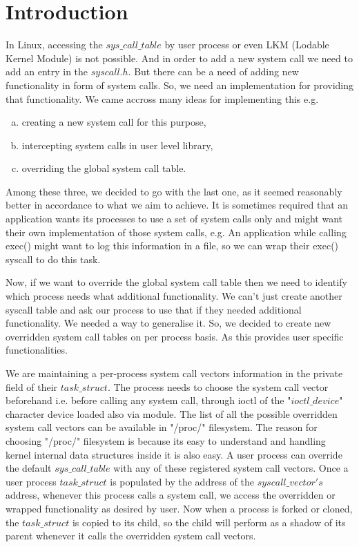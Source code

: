 \documentclass[11pt]{article}
\begin{document}
\section{Introduction}


In Linux, accessing the $sys\_call\_table$ by user process or even
LKM (Lodable Kernel Module) is not possible. And in order to add a new system call we need to add an entry
in the $syscall.h$.  But there can be a need of adding new functionality in form of system calls. So,
we need an implementation for providing that functionality. We came accross many ideas for implementing
this e.g. 
\begin{enumerate}[(a)]
\item
creating a new system call for this purpose, 
\item
intercepting system calls in user level library, 
\item
overriding the global system call table. 
\end{enumerate}
Among these three, we decided to go with the last one, as it
seemed reasonably better in accordance to what we aim to achieve. It is sometimes required that an application wants its processes to use a set of system calls only and might want their own implementation of those system calls, e.g. An application while calling 
exec() might want to log this information in a file, so we can wrap their exec() syscall to do this task.

Now, if we want to override the global system call table then we need to identify which process needs
what additional functionality. We can't just create another syscall table and ask our process to use that
if they needed additional functionality. We needed a way to generalise it. So, we decided to create 
new overridden system call tables on per process basis. As this provides user specific functionalities.

We are maintaining a per-process system call vectors information in the private field of their
$task\_struct$. The process needs to choose the system call vector beforehand i.e. before calling any system
call, through ioctl of the "$ioctl\_device$" character device loaded also via module. The list of all the possible
overridden system call vectors can be available in "/proc/" filesystem. The reason for choosing "/proc/" filesystem 
is because its easy to understand and handling kernel internal data structures inside it is also easy. 
A user process can override the default $sys\_call\_table$ with any of these registered system call vectors.
Once a user process $task\_struct$ is populated by the address of the $syscall\_vector's$ address,
whenever this process calls a system call, we access the overridden or wrapped functionality as desired by user. 
Now when a process is forked or cloned, the $task\_struct$ is copied to its child, so the child will perform
as a shadow of its parent whenever it calls the overridden system call vectors.
\end{document}
